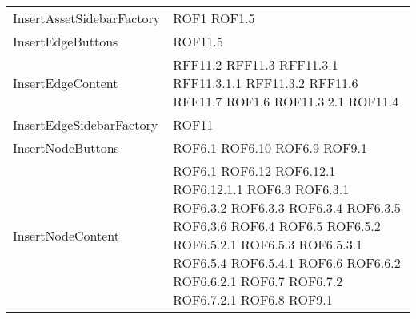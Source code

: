 \begin{longtable}{p{5cm}!{\VRule[1pt]}p{2.5cm}}
	InsertAssetSidebarFactory & ROF1 \newline ROF1.5\\
	InsertEdgeButtons & ROF11.5\\
	InsertEdgeContent & RFF11.2 \newline RFF11.3 \newline RFF11.3.1 \newline RFF11.3.1.1 \newline RFF11.3.2 \newline RFF11.6 \newline RFF11.7 \newline ROF1.6 \newline ROF11.3.2.1 \newline ROF11.4\\
	InsertEdgeSidebarFactory & ROF11\\
	InsertNodeButtons & ROF6.1 \newline ROF6.10 \newline ROF6.9 \newline ROF9.1\\
	InsertNodeContent & ROF6.1 \newline ROF6.12 \newline ROF6.12.1 \newline ROF6.12.1.1 \newline ROF6.3 \newline ROF6.3.1 \newline ROF6.3.2 \newline ROF6.3.3 \newline ROF6.3.4 \newline ROF6.3.5 \newline ROF6.3.6 \newline ROF6.4 \newline ROF6.5 \newline ROF6.5.2 \newline ROF6.5.2.1 \newline ROF6.5.3 \newline ROF6.5.3.1 \newline ROF6.5.4 \newline ROF6.5.4.1 \newline ROF6.6 \newline ROF6.6.2 \newline ROF6.6.2.1 \newline ROF6.7 \newline ROF6.7.2 \newline ROF6.7.2.1 \newline ROF6.8 \newline ROF9.1\\

\end{longtable}
